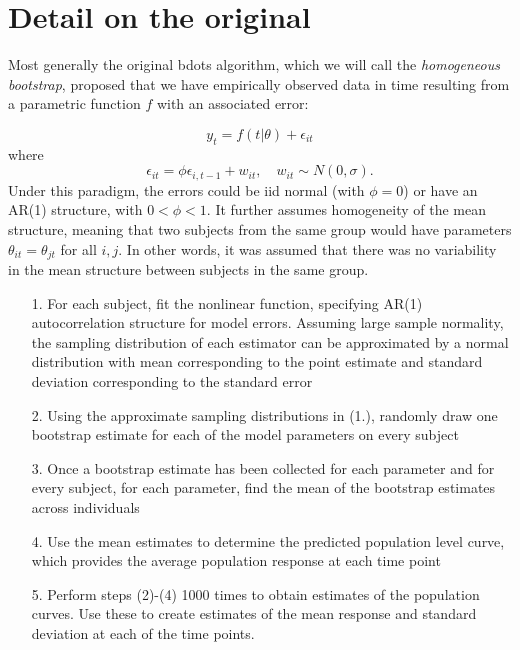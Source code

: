 \section{Detail on the original}

Most generally the original bdots algorithm, which we will call the \textit{homogeneous bootstrap}, proposed that we have empirically observed data in time resulting from a parametric function $f$ with an associated error: 

\begin{equation}\label{eq:mean_structure}
y_{t} = f(t|\theta) + \epsilon_{it}
\end{equation}
where 
\begin{equation}
\epsilon_{it} = \phi \epsilon_{i, t-1} + w_{it}, \quad w_{it} \sim N(0, \sigma).
\end{equation}
Under this paradigm, the errors could be iid normal (with $\phi = 0$) or have an AR(1) structure, with $0 < \phi < 1$. It further assumes homogeneity of the mean structure, meaning that two subjects from the same group would have parameters $\theta_{it} = \theta_{jt}$ for all $i, j$. In other words, it was assumed that there was no variability in the mean structure between subjects in the same group. 

\begin{enumerate}
\vspace{-3mm}
\item[1.] For each subject, fit the nonlinear function, specifying AR(1) autocorrelation structure for model errors. Assuming large sample normality, the sampling distribution of each estimator can be approximated by a normal distribution with mean corresponding to the point estimate and standard deviation corresponding to the standard error

\item[2.] Using the approximate sampling distributions in (1.), randomly draw one bootstrap estimate for each of the model parameters on every subject

\item[3.] Once a bootstrap estimate has been collected for each parameter and for every subject, for each parameter, find the mean of the bootstrap estimates across individuals

\item[4.] Use the mean estimates to determine the predicted population level curve, which provides the average population response at each time point

\item[5.] Perform steps (2)-(4) 1000 times to obtain estimates of the population curves. Use these to create estimates of the mean response and standard deviation at each of the time points. 
\end{enumerate}

